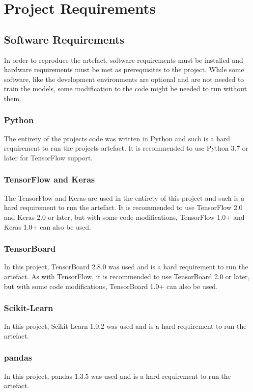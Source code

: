 \section{Project Requirements}
\subsection{Software Requirements}
In order to reproduce the artefact, software requirements must be installed and hardware requirements must be met as prerequisites to the project. While some software, like the development environments are optional and are not needed to train the models, some modification to the code might be needed to run without them.

\subsubsection{Python}
The entirety of the projects code was written in Python and such is a hard requirement to run the projects artefact. It is recommended to use Python 3.7 or later for TensorFlow support.

\subsubsection{TensorFlow and Keras}
The TensorFlow and Keras are used in the entirety of this project and such is a hard requirement to run the artefact. It is recommended to use TensorFlow 2.0 and Keras 2.0 or later, but with some code modifications, TensorFlow 1.0+ and Keras 1.0+ can also be used.

\subsubsection{TensorBoard}
In this project, TensorBoard 2.8.0 was used and is a hard requirement to run the artefact. As with TensorFlow, it is recommended to use TensorBoard 2.0 or later, but with some code modifications, TensorBoard 1.0+ can also be used.

\subsubsection{Scikit-Learn}
In this project, Scikit-Learn 1.0.2 was used and is a hard requirement to run the artefact.

\subsubsection{pandas}
In this project, pandas 1.3.5 was used and is a hard requirement to run the artefact.

